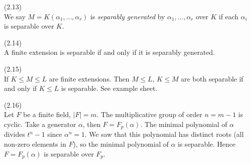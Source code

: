 \documentclass[a4paper]{article}
\begin{document}
\begin{defi}(2.13)\\
We say $M=K(\alpha_1,...,\alpha_r)$ is \emph{separably generated} by $\alpha_1,...,\alpha_r$ over $K$ if each $\alpha_i$ is separable over $K$.
\end{defi}

\begin{coro}(2.14)\\
A finite extension is separable if and only if it is separably generated.
\end{coro}

\begin{lemma}(2.15)\\
If $K \leq M \leq L$ are finite extensions. Then $M \leq L$, $K \leq M$ are both separable if and only if $K \leq L$ is separable. See example sheet.
\end{lemma}

\begin{eg}(2.16)\\
Let $F$ be a finite field, $|F| = m$. The multiplicative group of order $n=m-1$ is cyclic. Take a generator $\alpha$, then $F = F_p(\alpha)$. The minimal polynomial of $\alpha$ divides $t^n-1$ since $\alpha^n=1$. We saw that this polynomial has distinct roots (all non-zero elements in $F$), so the minimal polynomial of $\alpha$ is separable. Hence $F=F_p(\alpha)$ is separable over $F_p$.
\end{eg}
\end{document}
